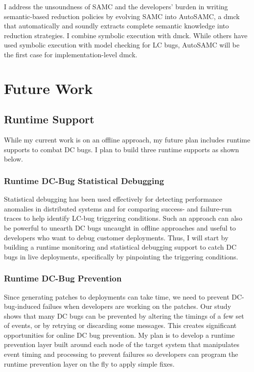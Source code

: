 \documentclass[11pt]{article}
\begin{document}
I address the unsoundness of SAMC and the developers' burden in writing
semantic-based reduction policies by evolving SAMC into AutoSAMC, a dmck that
automatically and soundly extracts complete semantic knowledge into reduction
strategies. I combine symbolic execution with dmck. While others have used
symbolic execution with model checking for LC bugs, AutoSAMC will be the first
case for implementation-level dmck. 

\section*{Future Work}

\subsection{Runtime Support}

While my current work is on an offline approach, my future plan includes runtime
supports to combat DC bugs. I plan to build three runtime supports as shown
below.

\subsubsection*{Runtime DC-Bug Statistical Debugging}

Statistical debugging has been used effectively for detecting performance
anomalies in distributed systems and for comparing success- and failure-run
traces to help identify LC-bug triggering conditions. Such an approach can also
be powerful to unearth DC bugs uncaught in offline approaches and useful to
developers who want to debug customer deployments. Thus, I will start by
building a runtime monitoring and statistical debugging support to catch DC bugs
in live deployments, specifically by pinpointing the triggering conditions.

\subsubsection*{Runtime DC-Bug Prevention}

Since generating patches to deployments can take time, we need to prevent
DC-bug-induced failues when developers are working on the patches. Our study
shows that many DC bugs can be prevented by altering the timings of a few set of
events, or by retrying or discarding some messages. This creates significant
opportunities for online DC bug prevention. My plan is to develop a runtime
prevention layer built around each node of the target system that manipulates
event timing and processing to prevent failures so developers can program the
runtime prevention layer on the fly to apply simple fixes.
\end{document}
